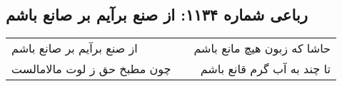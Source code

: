 \begin{center}
\section*{رباعی شماره ۱۱۳۴: از صنع برآیم بر صانع باشم}
\label{sec:1134}
\begin{longtable}{l p{0.5cm} r}
از صنع برآیم بر صانع باشم
&&
حاشا که زبون هیچ مانع باشم
\\
چون مطبخ حق ز لوت مالامالست
&&
تا چند به آب گرم قانع باشم
\\
\end{longtable}
\end{center}
